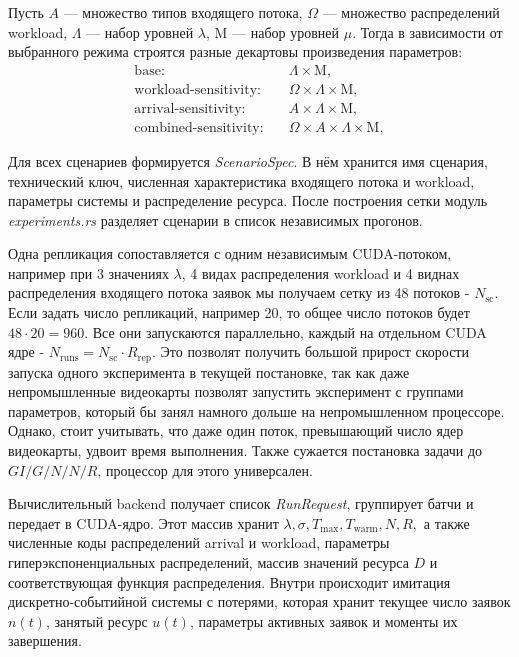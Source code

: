 Пусть $A$ --- множество типов входящего потока, $\Omega$ --- множество распределений workload, $\Lambda$ --- набор уровней $\lambda$, $\mathrm{M}$ --- набор уровней $\mu$. Тогда в зависимости от выбранного режима строятся разные декартовы произведения параметров:
$$
\begin{aligned}
\text{base:} \quad
& \Lambda \times \mathrm{M}, \\
\text{workload-sensitivity:} \quad
& \Omega \times \Lambda \times \mathrm{M}, \\
\text{arrival-sensitivity:} \quad
& A \times \Lambda \times \mathrm{M}, \\
\text{combined-sensitivity:} \quad
& \Omega \times A \times \Lambda \times \mathrm{M},
\end{aligned}
$$

Для всех сценариев формируется \textit{ScenarioSpec}. В нём хранится имя сценария, технический ключ, численная характеристика входящего потока и workload, параметры системы и распределение ресурса. После построения сетки модуль \textit{experiments.rs} разделяет сценарии в список независимых прогонов.

Одна репликация сопоставляется с одним независимым CUDA-потоком, например при 3 значениях $\lambda$, 4 видах распределения workload  и 4 виднах распределения входящего потока заявок мы получаем сетку из 48 потоков - $N_{\mathrm{sc}}$. Если задать число репликаций, например 20, то общее число потоков будет $48 \cdot 20 = 960$. Все они запускаются параллельно, каждый на отдельном CUDA ядре - $N_{\mathrm{runs}} = N_{\mathrm{sc}} \cdot R_{\mathrm{rep}}$. Это позволят получить большой прирост скорости запуска одного эксперимента в текущей постановке, так как даже непромышленные видеокарты позволят запустить эксперимент с группами параметров, который бы занял намного дольше на непромышленном процессоре. Однако, стоит учитывать, что даже один поток, превышающий число ядер видеокарты, удвоит время выполнения. Также сужается постановка задачи до $GI/G/N/N/R$, процессор для этого универсален.  

Вычислительный backend получает список \textit{RunRequest}, группирует батчи и передает в CUDA-ядро. Этот массив хранит $\lambda, \sigma, T_{\max}, T_{\mathrm{warm}}, N, R,$ а также численные коды распределений arrival и workload, параметры гиперэкспоненциальных распределений, массив значений ресурса $D$ и соответствующая функция распределения. Внутри происходит имитация дискретно-событийной системы с потерями, которая хранит текущее число заявок $n(t)$, занятый ресурс $u(t)$, параметры активных заявок и моменты их завершения. 


